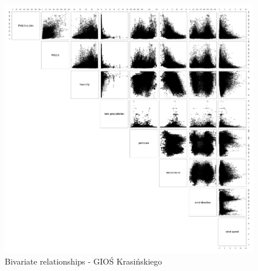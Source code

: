 \begin{landscape}
\begin{figure}[htp]
\centering
  \centering
  \includegraphics[width=0.65\linewidth]{figures/dataset/bivariate/relationships_gios_krasinskiego.png}
  \caption{Bivariate relationships - GIOŚ Krasińskiego}
  \label{fig:dataset-bivariate-krasinskiego}
  \end{figure}
\end{landscape}



